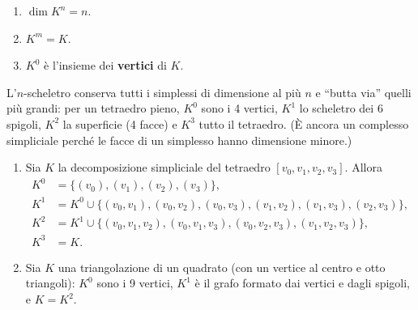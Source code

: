\begin{observacion}
\begin{enumerate}
    \item $\dim K^n = n$.
    \item $K^m = K$.
    \item $K^0$ \`e l'insieme dei \textbf{vertici} di $K$.
\end{enumerate}
\end{observacion}

\begin{intuizione}
L'$n$-scheletro conserva tutti i simplessi di dimensione al pi\`u $n$ e ``butta via'' quelli pi\`u grandi: per un tetraedro pieno, $K^0$ sono i 4 vertici, $K^1$ lo scheletro dei 6 spigoli, $K^2$ la superficie (4 facce) e $K^3$ tutto il tetraedro. (\`E ancora un complesso simpliciale perch\'e le facce di un simplesso hanno dimensione minore.)
\end{intuizione}


\begin{ejemplo}[Scheletri]
\begin{enumerate}
    \item Sia $K$ la decomposizione simpliciale del tetraedro $[v_0, v_1, v_2, v_3]$. Allora
    \begin{align*}
    K^0 &= \{ (v_0), (v_1), (v_2), (v_3) \}, \\
    K^1 &= K^0 \cup \{ (v_0,v_1), (v_0,v_2), (v_0,v_3), (v_1,v_2), (v_1,v_3), (v_2,v_3) \}, \\
    K^2 &= K^1 \cup \{ (v_0,v_1,v_2), (v_0,v_1,v_3), (v_0,v_2,v_3), (v_1,v_2,v_3) \}, \\
    K^3 &= K.
    \end{align*}
    \item Sia $K$ una triangolazione di un quadrato (con un vertice al centro e otto triangoli): $K^0$ sono i 9 vertici, $K^1$ \`e il grafo formato dai vertici e dagli spigoli, e $K = K^2$.
\end{enumerate}
\end{ejemplo}

